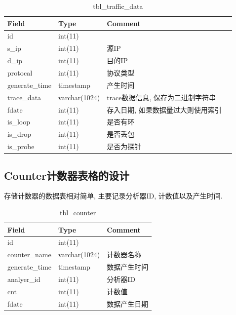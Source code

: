 \begin{table}[]
    \centering
    \caption{tbl\_traffic\_data}
    \begin{tabular}{llll}   \hline
    Field          & Type          & Comment                   \\ \hline
    id             & int(11)       &                           \\
    s\_ip          & int(11)       & 源IP                       \\
    d\_ip          & int(11)       & 目的IP                      \\
    protocal       & int(11)       & 协议类型                      \\
    generate\_time & timestamp     & 产生时间                      \\
    trace\_data    & varchar(1024) & trace数据信息, 保存为二进制字符串    \\
    fdate          & int(11)       & 存入日期, 如果数据量过大则使用索引 \\
    is\_loop       & int(11)       & 是否有环                      \\
    is\_drop       & int(11)       & 是否丢包                      \\
    is\_probe      & int(11)       & 是否为探针                    \\ \hline
    \end{tabular}
    \label{tbl_traffic_data}
\end{table}



\subsection{Counter计数器表格的设计}

存储计数器的数据表相对简单, 主要记录分析器ID, 计数值以及产生时间.

\begin{table}[]
    \centering
    \caption{tbl\_counter}
    \label{tbl_counter}
    \begin{tabular}{lll} \hline
    Field          & Type          & Comment \\ \hline
    id             & int(11)       &         \\
    counter\_name  & varchar(1024) & 计数器名称   \\
    generate\_time & timestamp     & 数据产生时间  \\
    analyer\_id    & int(11)       & 分析器ID   \\
    cnt            & int(11)       & 计数值     \\
    fdate          & int(11)       & 数据产生日期  \\ \hline
    \end{tabular}
\end{table}


